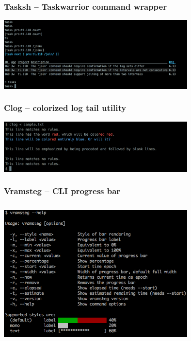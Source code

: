 \documentclass[t,handout]{beamer}
\begin{document}
\begin{frame}\frametitle{Tasksh -- Taskwarrior command wrapper}
    \vfill
    \begin{center}
        \href{http://tasktools.org/projects/tasksh.html}{\includegraphics[width=10cm]{tasksh.png}}
    \end{center}
\end{frame}

\begin{frame}\frametitle{Clog -- colorized log tail utility}
    \vfill
    \begin{center}
        \href{http://tasktools.org/projects/clog.html}{\includegraphics[width=10cm]{clog.png}}
    \end{center}
    \vfill
\end{frame}

\begin{frame}\frametitle{Vramsteg -- CLI progress bar}
    \begin{center}
        \href{http://tasktools.org/projects/vramsteg.html}{\includegraphics[width=10cm,height=7.5cm]{vramsteg.png}}
    \end{center}
\end{frame}
\end{document}
